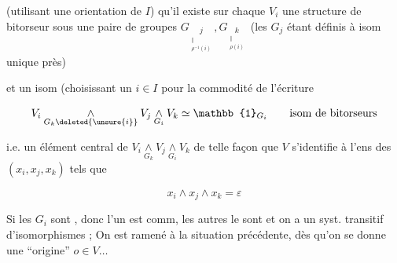 
(utilisant une orientation de $I$) qu'il existe sur chaque $V_i$ une structure de bitorseur  sous une paire de groupes $G_{\underset{\substack{\Vert\\\rho^{-1}(i)}}{j}},G_{\underset{\substack{\Vert\\\rho(i)}}{k}}$ (les $G_j$ étant définis  à isom unique près)


et un isom (choisissant un $i\in I$ pour la commodité de l'écriture

\[
V_i\mathbin{\underset{G_k\deleted{\unsure{i}}}{\wedge}}V_j
 \mathbin{\underset{G_i}{\wedge}}V_k\simeq\mathbb{1}_{G_i}
 \qquad\text{isom de bitorseurs}
\]

i.e. un élément central  de $V_i\mathbin{\underset{G_k}{\wedge}}V_j\mathbin{\underset{G_i}{\wedge}}V_k$ de telle façon que $V$ s'identifie à l'ens des $(x_i,x_j,x_k)$ tels que

\[
 x_i\wedge x_j\wedge x_k=\varepsilon
\]

Si les $G_i$ sont  , donc  l'un est comm, les autres le sont et on a un syst. transitif d'isomorphismes ; On est ramené à la situation précédente, dès qu'on se donne une ``origine'' $o\in V\ldots$

